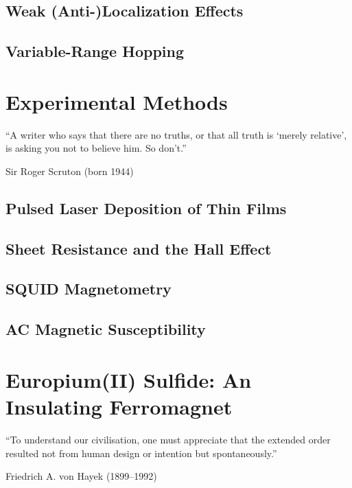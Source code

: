 ﻿\documentclass{report}
\begin{document}
    \section{Weak (Anti-)Localization Effects}\label{sec:wl}
        
    \section{Variable-Range Hopping}\label{sec:vrh}
        


\chapter{Experimental Methods}\label{ch:methods}%
\epigraph{``A writer who says that there are no truths, or that all truth is `merely relative', is asking you not to believe him. So don't.''}{Sir Roger Scruton (born 1944)}
    \section{Pulsed Laser Deposition of Thin Films}\label{sec:pld}
		
    \section{Sheet Resistance and the Hall Effect}\label{sec:vdp}
		
    \section{SQUID Magnetometry}\label{sec:squid}
        
    \section{AC Magnetic Susceptibility}\label{sec:acm}
        


\chapter{Europium(II) Sulfide: An Insulating Ferromagnet}\label{ch:EuS}
\epigraph{``To understand our civilisation, one must appreciate that the extended order resulted not from human design or intention but spontaneously.''}{Friedrich A. von Hayek (1899--1992)}~\\
    
\end{document}
